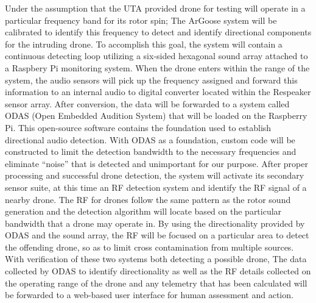 Under the assumption that the UTA provided drone for testing will operate in a particular frequency band for its rotor spin; The ArGoose system will be calibrated to identify this frequency to detect and identify directional components for the intruding drone. To accomplish this goal, the system will contain a continuous detecting loop utilizing a six-sided hexagonal sound array attached to a Raspbery Pi monitoring system. When the drone enters within the range of the system, the audio sensors will pick up the frequency assigned and forward this information to an internal audio to digital converter located within the Respeaker sensor array. After conversion, the data will be forwarded to a system called ODAS (Open Embedded Audition System) that will be loaded on the Raspberry Pi. This open-source software contains the foundation used to establish directional audio detection. With ODAS as a foundation, custom code will be constructed to limit the detection bandwidth to the necessary frequencies and eliminate “noise” that is detected and unimportant for our purpose. After proper processing and successful drone detection, the system will activate its secondary sensor suite, at this time an RF detection system and identify the RF signal of a nearby drone. The RF for drones follow the same pattern as the rotor sound generation and the detection algorithm will locate based on the particular bandwidth that a drone may operate in. By using the directionality provided by ODAS and the sound array, the RF will be focused on a particular area to detect the offending drone, so as to limit cross contamination from multiple sources. With verification of these two systems both detecting a possible drone, The data collected by ODAS to identify directionality as well as the RF details collected on the operating range of the drone and any telemetry that has been calculated will be forwarded to a web-based user interface for human assessment and action.
